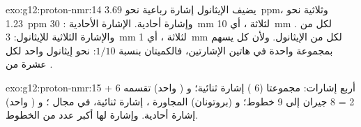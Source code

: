 \begin{solution}{exo:g12:proton-nmr:14}
يضيف الإيثانول إشارة رباعية نحو \qty{3.69}{ppm}، وثلاثية نحو
\qty{1.23}{ppm} وإشارة  أحادية. الإشارة الأحادية : \qty{30}{mm}
لثلاثة ، أي \qty{10}{mm} لكل  من . والإشارة الثلاثية للإيثانول:
\qty{3}{mm} لثلاثة ، أي \qty{1}{mm} لكل  من الإيثانول. ولأن كل
 يسهم بمجموعة  واحدة في هاتين الإشارتين، فالكميتان بنسبة
$1/10$: نحو  إيثانول واحد لكل عشرة  من .
\end{solution}

\begin{solution}{exo:g12:proton-nmr:15}
أربع إشارات: مجموعتا  (6 ) إشارة ثنائية؛ و (
واحد) تقسمه 6 + 2 = 8 جيران إلى 9 خطوط؛ و (بروتونان)
المجاورة  ، إشارة ثنائية، في مجال ؛
و ( واحد) إشارة أحادية. وإشارة  لها أكبر عدد من الخطوط.
\end{solution}

